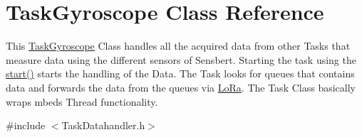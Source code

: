 \hypertarget{class_task_gyroscope}{}\section{Task\+Gyroscope Class Reference}
\label{class_task_gyroscope}


This \hyperlink{class_task_gyroscope}{Task\+Gyroscope} Class handles all the acquired data from other Tasks that measure data using the different sensors of Sensbert. Starting the task using the \hyperlink{class_task_gyroscope_a0306fb16429f8582db336a1140eae0b1}{start()} starts the handling of the Data. The Task looks for queues that contains data and forwards the data from the queues via \hyperlink{class_lo_ra}{Lo\+Ra}. The Task Class basically wraps mbeds Thread functionality.  




{\ttfamily \#include $<$Task\+Datahandler.\+h$>$}

